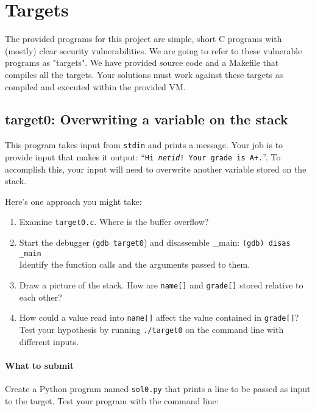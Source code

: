 \documentclass[letterpaper,12pt]{report}
\begin{document}
{%


\section*{Targets}
\label{sec:targets}

The provided programs for this project are simple, short C programs with
(mostly) clear security vulnerabilities. We are going to refer to these
vulnerable programs as "targets". We have provided source code and a Makefile
that compiles all the targets. Your solutions must work against these targets
as compiled and executed within the provided VM.



\subsection*{target0: Overwriting a variable on the stack}
\label{sec:target0}

This program takes input from \texttt{stdin} and prints a message.  Your job is to provide input that makes it output: ``\texttt{Hi \emph{netid}! Your grade is A+.}''.  To accomplish this, your input will need to overwrite another variable stored on the stack.

\smallskip

Here's one approach you might take:
\begin{enumerate}
\item Examine \texttt{target0.c}.  Where is the buffer overflow?
\item Start the debugger (\texttt{gdb target0}) and disassemble \_main: \texttt{(gdb) disas \_main}\\
Identify the function calls and the arguments passed to them.
\item Draw a picture of the stack.  How are \texttt{name[]} and \texttt{grade[]} stored relative to each other?
\item How could a value read into \texttt{name[]} affect the value contained in \texttt{grade[]}?  Test your hypothesis by running \texttt{./target0} on the command line with different inputs.
\end{enumerate}

\paragraph{What to submit}
Create a Python program named \texttt{sol0.py} that prints a line to be passed as input to the target.  Test your program with the command line:

}
\end{document}
